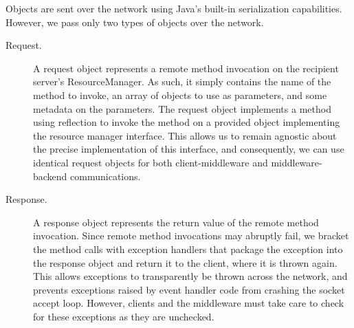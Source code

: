 \documentclass[letterpaper,11pt]{article}
\begin{document}
Objects are sent over the network using Java's built-in serialization
capabilities. However, we pass only two types of objects over the network.

\begin{description}
    \item[Request.] A request object represents a remote method invocation on
        the recipient server's ResourceManager. As such, it simply contains the
        name of the method to invoke, an array of objects to use as parameters,
        and some metadata on the parameters. The request object implements a
        method using reflection to invoke the method on a provided object
        implementing the resource manager interface. This allows us to remain
        agnostic about the precise implementation of this interface, and
        consequently, we can use identical request objects for both
        client-middleware and middleware-backend communications.

    \item[Response.] A response object represents the return value of the
        remote method invocation. Since remote method invocations may abruptly
        fail, we bracket the method calls with exception handlers that
        package the exception into the response object and return it to the
        client, where it is thrown again. This allows exceptions to
        transparently be thrown across the network, and prevents exceptions
        raised by event handler code from crashing the socket accept loop.
        However, clients and the middleware must take care to check for these
        exceptions as they are unchecked.
\end{description}
\end{document}
